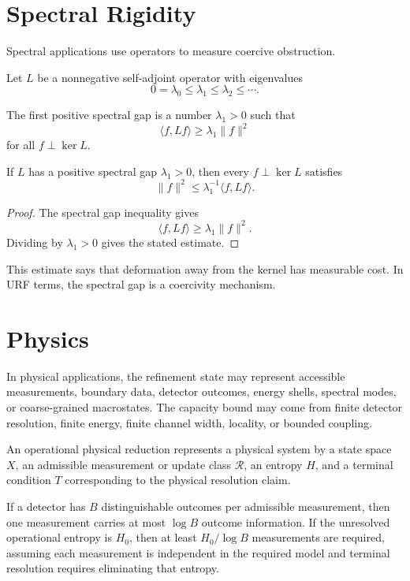 \section{Spectral Rigidity}

Spectral applications use operators to measure coercive obstruction.

Let \(L\) be a nonnegative self-adjoint operator with eigenvalues
\[
0=\lambda_0\le \lambda_1\le \lambda_2\le\cdots.
\]

\begin{definition}
The first positive spectral gap is a number \(\lambda_1>0\) such that
\[
\langle f,Lf\rangle\ge \lambda_1\|f\|^2
\]
for all \(f\perp \ker L\).
\end{definition}

\begin{theorem}
If \(L\) has a positive spectral gap \(\lambda_1>0\), then every
\(f\perp\ker L\) satisfies
\[
\|f\|^2\le \lambda_1^{-1}\langle f,Lf\rangle.
\]
\end{theorem}

\begin{proof}
The spectral gap inequality gives
\[
\langle f,Lf\rangle\ge \lambda_1\|f\|^2.
\]
Dividing by \(\lambda_1>0\) gives the stated estimate.
\end{proof}

This estimate says that deformation away from the kernel has measurable cost.
In URF terms, the spectral gap is a coercivity mechanism.

\section{Physics}

In physical applications, the refinement state may represent accessible
measurements, boundary data, detector outcomes, energy shells, spectral modes,
or coarse-grained macrostates. The capacity bound may come from finite detector
resolution, finite energy, finite channel width, locality, or bounded coupling.

\begin{definition}
An operational physical reduction represents a physical system by a state
space \(X\), an admissible measurement or update class \(\mathcal R\), an
entropy \(H\), and a terminal condition \(T\) corresponding to the physical
resolution claim.
\end{definition}

\begin{example}
If a detector has \(B\) distinguishable outcomes per admissible measurement,
then one measurement carries at most \(\log B\) outcome information. If the
unresolved operational entropy is \(H_0\), then at least \(H_0/\log B\)
measurements are required, assuming each measurement is independent in the
required model and terminal resolution requires eliminating that entropy.
\end{example}

